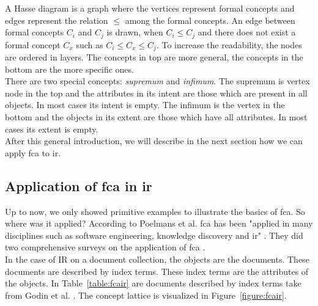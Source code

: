 \documentclass[11pt]{report}
\begin{document}
A Hasse diagram is a graph where the vertices represent formal concepts and edges represent the relation $\le$ among the formal concepts. An edge between formal concepts $C_i$ and $C_j$ is drawn, when $C_i \le C_j$ and there does not exist a formal concept $C_x$ such as $C_i \le C_x \le C_j$. To increase the readability, the nodes are ordered in layers. The concepts in top are more general, the concepts in the bottom are the more specific ones.\\

There are two special concepts: \textit{supremum} and \textit{infimum}. The supremum is vertex node in the top and the attributes in its intent are those which are present in all objects. In most cases its intent is empty. The infimum is the vertex in the bottom and the objects in its extent are those which have all attributes. In most cases its extent is empty.\\

After this general introduction, we will describe in the next section how we can apply \acrshort{fca} to \acrshort{ir}.

\subsection{Application of \acrshort{fca} in \acrshort{ir}}
\label{section:fcair}

Up to now, we only showed primitive examples to illustrate the basics of \acrshort{fca}. So where was it applied? According to Poelmans et al. \acrshort{fca} has been "applied in many disciplines such as software engineering, knowledge discovery and \acrshort{ir}" \cite{Poelmans2013}. They did two comprehensive surveys on the application of \acrshort{fca} \cite{Poelmans2013, Poelmans2013b}. \\

In the case of IR on a document collection, the objects are the documents. These documents are described by index terms. These index terms are the attributes of the objects. In Table~\ref{table:fcair} are documents described by index terms take from Godin et al. \cite{Godin1993}. The concept lattice is visualized in Figure~\ref{figure:fcair}.
\end{document}
